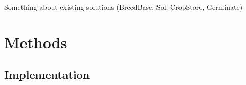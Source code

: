 \documentclass[9pt,a4paper]{extarticle}
\begin{document}
Something about existing solutions (BreedBase, Sol, CropStore, Germinate)



\section*{Methods}%
















\subsection*{Implementation}
\end{document}

